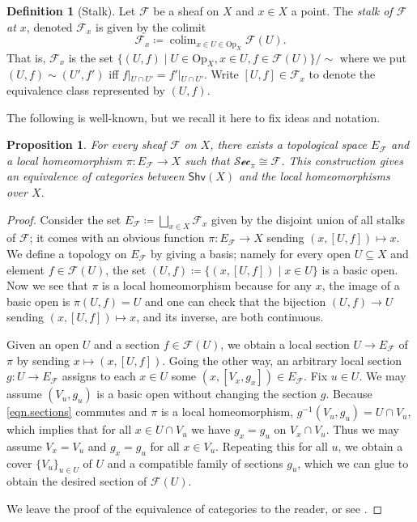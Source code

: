 \documentclass[11pt, oneside, article]{memoir}
\theoremstyle{plain}
\newtheorem{proposition}[theorem]{Proposition}
\theoremstyle{definition}
\newtheorem{definition}[theorem]{Definition}
\theoremstyle{remark}
\renewcommand{\ss}{\subseteq}
\DeclareMathOperator*{\colim}{colim}
\newcommand{\Set}[1]{\mathrm{#1}}
\newcommand{\fun}[1]{\mathcal{#1}}
\newcommand{\Fun}[1]{\mathsf{#1}}
\newcommand{\sheaf}[1]{\fun{#1}}
\renewcommand{\sec}{\sheaf{Sec}}
\newcommand{\shv}{\Fun{Shv}}
\newcommand{\Op}{\Set{Op}}
\newcommand{\inv}{^{-1}}
\newcommand{\rest}[2]{#1\big|\hspace{0in}_{#2}}
\begin{document}
\begin{definition}[Stalk]
Let $\sheaf{F}$ be a sheaf on $X$ and $x\in X$ a point. The \emph{stalk of $\sheaf{F}$ at $x$}, denoted $\sheaf{F}_x$ is given by the colimit
\[\sheaf{F}_x\coloneqq\colim_{x\in U\in\Op_X}\sheaf{F}(U).\]
That is, $\sheaf{F}_x$ is the set $\{(U,f)\mid U\in\Op_X, x\in U, f\in \sheaf{F}(U)\}/\sim$ where we put $(U,f)\sim (U',f')$ iff $\rest{f}{U\cap U'}=\rest{f'}{U\cap U'}$. Write $[U,f]\in \sheaf{F}_x$ to denote the equivalence class represented by $(U,f)$.
\end{definition}

The following is well-known, but we recall it here to fix ideas and notation.

\begin{proposition}\label{prop.local_homeo}
For every sheaf $\sheaf{F}$ on $X$, there exists a topological space $E_\sheaf{F}$ and a local homeomorphism $\pi\colon E_\sheaf{F}\to X$ such that $\sec_\pi\cong\sheaf{F}$. This construction gives an equivalence of categories between $\shv(X)$ and the local homeomorphisms over $X$.
\end{proposition}
\begin{proof}
Consider the set $E_\sheaf{F}\coloneqq\bigsqcup_{x\in X}\sheaf{F}_x$ given by the disjoint union of all stalks of $\sheaf{F}$; it comes with an obvious function $\pi\colon E_\sheaf{F}\to X$ sending $(x,[U,f])\mapsto x$. We define a topology on $E_\sheaf{F}$ by giving a basis; namely for every open $U\ss X$ and element $f\in\sheaf{F}(U)$, the set $(U,f)\coloneqq\{(x,[U,f])\mid x\in U\}$ is a basic open. Now we see that $\pi$ is a local homeomorphism because for any $x$, the image of a basic open is $\pi(U,f)=U$ and one can check that the bijection $(U,f)\to U$ sending $(x,[U,f])\mapsto x$, and its inverse, are both continuous.

Given an open $U$ and a section $f\in\sheaf{F}(U)$, we obtain a local section $U\to E_\sheaf{F}$ of $\pi$ by sending $x\mapsto (x,[U,f])$. Going the other way, an arbitrary local section $g\colon U\to E_\sheaf{F}$ assigns to each $x\in U$ some $(x,[V_x,g_x])\in E_\sheaf{F}$. Fix $u\in U$. We may assume $(V_u,g_u)$ is a basic open without changing the section $g$. Because \eqref{eqn.sections} commutes and $\pi$ is a local homeomorphism, $g\inv(V_u,g_u)=U\cap V_u$, which implies that for all $x\in U\cap V_u$ we have $g_{x}=g_u$ on $V_x\cap V_u$. Thus we may assume $V_x=V_u$ and $g_x=g_u$ for all $x\in V_u$. Repeating this for all $u$, we obtain a cover $\{V_u\}_{u\in U}$ of $U$ and a compatible family of sections $g_u$, which we can glue to obtain the desired section of $\sheaf{F}(U)$.

We leave the proof of the equivalence of categories to the reader, or see \cite[Corollary 2.6.3]{MacLane.Moerdijk:1992a}.
\end{proof}
\end{document}
